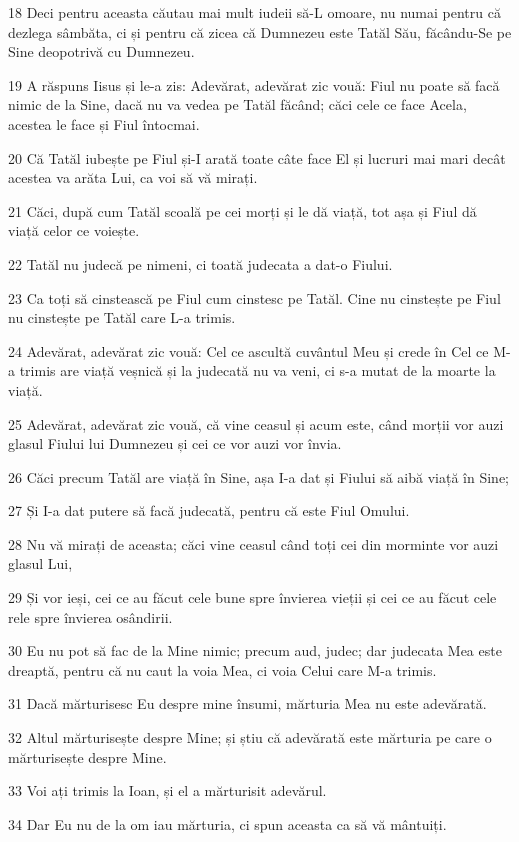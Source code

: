 \par 18 Deci pentru aceasta căutau mai mult iudeii să-L omoare, nu numai pentru că dezlega sâmbăta, ci și pentru că zicea că Dumnezeu este Tatăl Său, făcându-Se pe Sine deopotrivă cu Dumnezeu.
\par 19 A răspuns Iisus și le-a zis: Adevărat, adevărat zic vouă: Fiul nu poate să facă nimic de la Sine, dacă nu va vedea pe Tatăl făcând; căci cele ce face Acela, acestea le face și Fiul întocmai.
\par 20 Că Tatăl iubește pe Fiul și-I arată toate câte face El și lucruri mai mari decât acestea va arăta Lui, ca voi să vă mirați.
\par 21 Căci, după cum Tatăl scoală pe cei morți și le dă viață, tot așa și Fiul dă viață celor ce voiește.
\par 22 Tatăl nu judecă pe nimeni, ci toată judecata a dat-o Fiului.
\par 23 Ca toți să cinstească pe Fiul cum cinstesc pe Tatăl. Cine nu cinstește pe Fiul nu cinstește pe Tatăl care L-a trimis.
\par 24 Adevărat, adevărat zic vouă: Cel ce ascultă cuvântul Meu și crede în Cel ce M-a trimis are viață veșnică și la judecată nu va veni, ci s-a mutat de la moarte la viață.
\par 25 Adevărat, adevărat zic vouă, că vine ceasul și acum este, când morții vor auzi glasul Fiului lui Dumnezeu și cei ce vor auzi vor învia.
\par 26 Căci precum Tatăl are viață în Sine, așa I-a dat și Fiului să aibă viață în Sine;
\par 27 Și I-a dat putere să facă judecată, pentru că este Fiul Omului.
\par 28 Nu vă mirați de aceasta; căci vine ceasul când toți cei din morminte vor auzi glasul Lui,
\par 29 Și vor ieși, cei ce au făcut cele bune spre învierea vieții și cei ce au făcut cele rele spre învierea osândirii.
\par 30 Eu nu pot să fac de la Mine nimic; precum aud, judec; dar judecata Mea este dreaptă, pentru că nu caut la voia Mea, ci voia Celui care M-a trimis.
\par 31 Dacă mărturisesc Eu despre mine însumi, mărturia Mea nu este adevărată.
\par 32 Altul mărturisește despre Mine; și știu că adevărată este mărturia pe care o mărturisește despre Mine.
\par 33 Voi ați trimis la Ioan, și el a mărturisit adevărul.
\par 34 Dar Eu nu de la om iau mărturia, ci spun aceasta ca să vă mântuiți.
